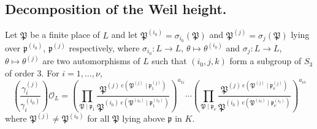
\subsection{Decomposition of the Weil height.} 

\begin{lemma}\label{lem:cancellation}
Let $\mathfrak{P}$ be a finite place of $L$ and let $\mathfrak{P}^{(i_0)} = \sigma_{i_0}(\mathfrak{P})$ and $\mathfrak{P}^{(j)} = \sigma_{j}(\mathfrak{P})$ lying over $\mathfrak{p}^{(i_0)}$, $\mathfrak{p}^{(j)}$ respectively, where $\sigma_{i_0}: L \to L$, $\theta \mapsto \theta^{(i_0)}$ and $\sigma_{j}: L \to L$, $\theta \mapsto \theta^{(j)}$ are two automorphisms of $L$ such that $(i_0,j,k)$ form a subgroup of $S_3$ of order $3$. For $i = 1, \dots, \nu$, 
\[\left( \frac{\gamma_i^{(j)}}{\gamma_i^{(i_0)}}\right)\mathcal{O}_L 
	 = \left(\prod_{\mathfrak{P}\mid\mathfrak{p}_1} \frac{\mathfrak{P}^{(j) \ e(\mathfrak{P}^{(j)}\mid\mathfrak{p}_1^{(j)})}}{\mathfrak{P}^{(i_0) \ e(\mathfrak{P}^{(i_0)}\mid\mathfrak{p}^{(i_0)}_1)}}\right)^{a_{1i}} \cdots \left(\prod_{\mathfrak{P}\mid\mathfrak{p}_{\nu}} \frac{\mathfrak{P}^{(j) \ e(\mathfrak{P}^{(j)}\mid\mathfrak{p}^{(j)}_{\nu})}}{\mathfrak{P}^{(i_0) \ e(\mathfrak{P}^{(i_0)}\mid\mathfrak{p}^{(i_0)}_{\nu})}}\right)^{a_{\nu i}}\]
where $\mathfrak{P}^{(j)} \neq \mathfrak{P}^{(i_0)}$ for all $\mathfrak{P}$ lying above $\mathfrak{p}$ in $K$. 
\end{lemma}

